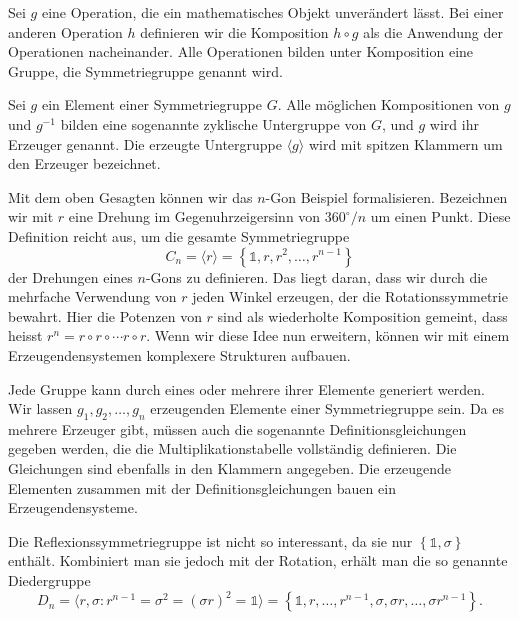 \begin{definition}[Symmetriegruppe]
	Sei \(g\) eine Operation, die ein mathematisches Objekt unverändert lässt.
	Bei einer anderen Operation \(h\) definieren wir die Komposition \(h\circ g\)
	als die Anwendung der Operationen nacheinander. Alle Operationen bilden unter
	Komposition eine Gruppe, die Symmetriegruppe genannt wird.
\end{definition}

\begin{definition}
	Sei \(g\) ein Element einer Symmetriegruppe \(G\). Alle möglichen
	Kompositionen von \(g\) und \(g^{-1}\) bilden eine sogenannte zyklische
	Untergruppe von \(G\), und \(g\) wird ihr Erzeuger genannt. Die erzeugte
	Untergruppe \(\langle g \rangle\) wird mit spitzen Klammern um den Erzeuger
	bezeichnet.
\end{definition}

Mit dem oben Gesagten können wir das \(n\)-Gon Beispiel formalisieren.
Bezeichnen wir mit \(r\) eine Drehung im Gegenuhrzeigersinn von \(360^\circ/n\)
um einen Punkt.  Diese Definition reicht aus, um die gesamte Symmetriegruppe
\[
	C_n = \langle r \rangle
		= \left\{\mathds{1}, r, r^2, \ldots, r^{n-1}\right\}
\]
der Drehungen eines \(n\)-Gons zu definieren. Das liegt daran,
dass wir durch die mehrfache Verwendung von \(r\) jeden Winkel erzeugen, der
die Rotationssymmetrie bewahrt. Hier die Potenzen von \(r\) sind als
wiederholte Komposition gemeint, dass heisst \(r^n = r\circ r \circ \cdots
r\circ r\).  Wenn wir diese Idee nun erweitern, können wir mit einem
Erzeugendensystemen komplexere Strukturen aufbauen.

\begin{definition}[Erzeugendensysteme]
	Jede Gruppe kann durch eines oder mehrere ihrer Elemente generiert werden.
	Wir lassen \(g_1, g_2, \ldots, g_n\) erzeugenden Elemente einer
	Symmetriegruppe sein.  Da es mehrere Erzeuger gibt, müssen auch die
	sogenannte Definitionsgleichungen gegeben werden, die die
	Multiplikationstabelle vollständig definieren. Die Gleichungen sind ebenfalls
	in den Klammern angegeben. Die erzeugende Elementen zusammen mit der
	Definitionsgleichungen bauen ein Erzeugendensysteme.
\end{definition}

Die Reflexionssymmetriegruppe ist nicht so interessant, da sie nur
\(\left\{\mathds{1}, \sigma\right\}\) enthält. Kombiniert man sie jedoch mit
der Rotation, erhält man die so genannte Diedergruppe
\[
	D_n = \langle r, \sigma : r^{n-1} = \sigma^2 = (\sigma r)^2 = \mathds{1} \rangle
		= \left\{
				\mathds{1}, r, \ldots, r^{n-1}, \sigma, \sigma r, \ldots, \sigma r^{n-1}
		\right\}.
\]

